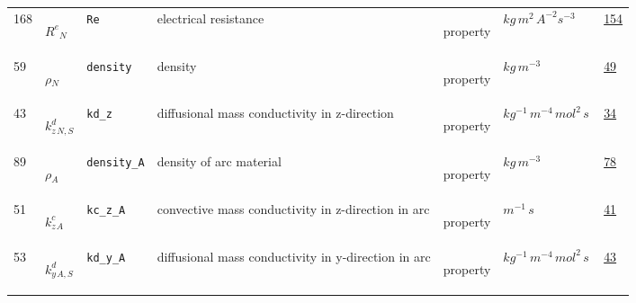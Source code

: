 \begin{longtable}{|p{1cm}|p{2.5cm}|p{4.5cm}|p{8cm}|p{3.0cm}|p{3cm}|p{1cm}|}
            168
             & \hypertarget{"v:168"}{ $ {{R^e}}{_{N}} $}
             & \verb|Re|
             & electrical resistance
             & \begin{lay}property \end{lay}
             & $ kg \,m^{2} \,A^{-2} s^{-3} \, $
             &                 \hyperlink{"e:154"}{ 154 }
                 \\
            59
             & \hypertarget{"v:59"}{ $ {\rho}{_{N}} $}
             & \verb|density|
             & density
             & \begin{lay}property \end{lay}
             & $ kg \,m^{-3} \, $
             &                 \hyperlink{"e:49"}{ 49 }
                 \\
            43
             & \hypertarget{"v:43"}{ $ {{k^d_z}}{_{N, S}} $}
             & \verb|kd_z|
             & diffusional mass conductivity in z-direction
             & \begin{lay}property \end{lay}
             & $ kg^{-1} \,m^{-4} \,mol^{2} \,s \, $
             &                 \hyperlink{"e:34"}{ 34 }
                 \\
            89
             & \hypertarget{"v:89"}{ $ {\rho}{_{A}} $}
             & \verb|density_A|
             & density of arc material
             & \begin{lay}property \end{lay}
             & $ kg \,m^{-3} \, $
             &                 \hyperlink{"e:78"}{ 78 }
                 \\
            51
             & \hypertarget{"v:51"}{ $ {{k^c_z}}{_{A}} $}
             & \verb|kc_z_A|
             &  convective mass conductivity in z-direction in arc
             & \begin{lay}property \end{lay}
             & $ m^{-1} \,s \, $
             &                 \hyperlink{"e:41"}{ 41 }
                 \\
            53
             & \hypertarget{"v:53"}{ $ {{k^d_y}}{_{A, S}} $}
             & \verb|kd_y_A|
             & diffusional mass conductivity in y-direction in arc
             & \begin{lay}property \end{lay}
             & $ kg^{-1} \,m^{-4} \,mol^{2} \,s \, $
             &                 \hyperlink{"e:43"}{ 43 }
                 \\

\end{longtable}

